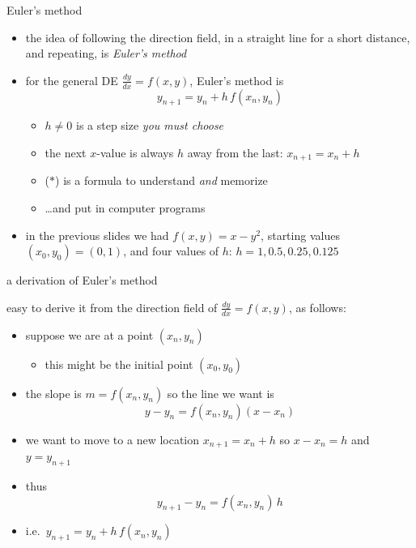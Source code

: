\documentclass[colorlinks]{beamer}
\begin{document}
\begin{frame}{Euler's method}

\begin{itemize}
\item the idea of following the direction field, in a straight line for a short distance, and repeating, is \emph{Euler's method}
\item for the general DE $\frac{dy}{dx} = f(x,y)$, Euler's method is
\begin{equation}
    y_{n+1} = y_n + h\, f(x_n,y_n)   \tag{$\ast$}
\end{equation}

\vspace{-2mm}
    \begin{itemize}
    \item $h\ne 0$ is a step size \emph{you must choose}
    \item the next $x$-value is always $h$ away from the last: $x_{n+1} = x_n + h$
    \item ($\ast$) is a formula to understand \emph{and} memorize
    \item \dots and put in computer programs
    \end{itemize}
\item in the previous slides we had $f(x,y)=x-y^2$, starting values $(x_0,y_0)=(0,1)$, and four values of $h$: $h=1,0.5,0.25,0.125$
\end{itemize}
\end{frame}


\begin{frame}{a derivation of Euler's method}

easy to derive it from the direction field of $\frac{dy}{dx} = f(x,y)$, as follows:
\begin{itemize}
\item suppose we are at a point $(x_n,y_n)$
    \begin{itemize}
    \item this might be the initial point $(x_0,y_0)$
    \end{itemize}
\item the slope is $m=f(x_n,y_n)$ so the line we want is
    $$y-y_n = f(x_n,y_n)(x-x_n)$$
\item we want to move to a new location $x_{n+1}=x_n+h$ so $x-x_n=h$ and $y=y_{n+1}$
\item thus
    $$y_{n+1} - y_n = f(x_n,y_n)\, h$$
\item i.e.~$y_{n+1} = y_n + h\, f(x_n,y_n)$
\end{itemize}
\end{frame}
\end{document}

